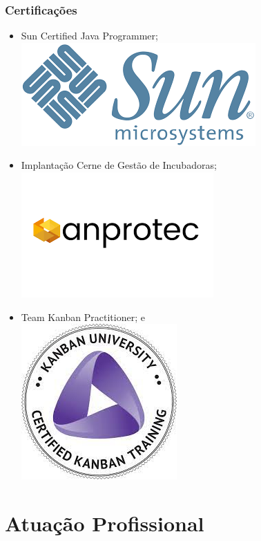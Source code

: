 \documentclass[aspectratio=169]{beamer}
\begin{document}
\begin{frame}
	\frametitle{Certifica\c cões}

	\begin{itemize}
		\item Sun Certified Java Programmer;\\
		\includegraphics[scale=0.2]{imagens/sun}
		
		\item Implantação Cerne de Gestão de Incubadoras;\\
		\includegraphics[scale=0.2]{imagens/anprotec}
		
		\item Team Kanban Practitioner; e\\
		\includegraphics[scale=0.2]{imagens/kanban}
	\end{itemize}
\end{frame}


\section{Atuação Profissional}
\end{document}
